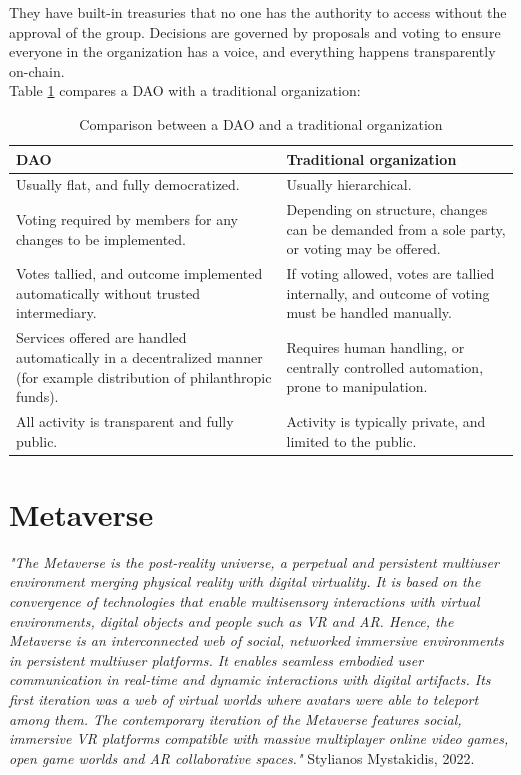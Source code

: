 \documentclass[MSE,Master,english]{twbook}%
\begin{document}
They have built-in treasuries that no one has the authority to access without the approval of the group. Decisions are governed by proposals and voting to ensure everyone in the organization has a voice, and everything happens transparently on-chain.\cite{DAO} \\

Table \ref{table:DAOComparison} compares a \gls{DAO} with a traditional organization:
\begin{center}
  \begin{table}[H]
    \begin{tabular}{ | m{20em} | m{20em} | }
      \hline
      \textbf{DAO} & \textbf{Traditional organization} \\ 
      \hline
      Usually flat, and fully democratized. & Usually hierarchical. \\
      \hline  
      Voting required by members for any changes to be implemented. & Depending on structure, changes can be demanded from a sole party, or voting may be offered. \\
      \hline
      Votes tallied, and outcome implemented automatically without trusted intermediary. & If voting allowed, votes are tallied internally, and outcome of voting must be handled manually. \\
      \hline
      Services offered are handled automatically in a decentralized manner (for example distribution of philanthropic funds). & Requires human handling, or centrally controlled automation, prone to manipulation. \\
      \hline
      All activity is transparent and fully public. & Activity is typically private, and limited to the public. \\
      \hline
    \end{tabular}
    \caption{Comparison between a \gls{DAO} and a traditional organization \cite{DAO}}
    \label{table:DAOComparison}
  \end{table}
\end{center}

\section{Metaverse}
\emph{"The Metaverse is the post-reality universe, a perpetual and persistent multiuser environment merging physical reality with digital virtuality. It is based on the convergence of technologies that enable multisensory interactions with virtual environments, digital objects and people such as \ac{VR} and \ac{AR}. Hence, the Metaverse is an interconnected web of social, networked immersive environments in persistent multiuser platforms. It enables seamless embodied user communication in real-time and dynamic interactions with digital artifacts. Its first iteration was a web of virtual worlds where avatars were able to teleport among them. The contemporary iteration of the Metaverse features social, immersive \gls{VR} platforms compatible with massive multiplayer online video games, open game worlds and \gls{AR} collaborative spaces."} Stylianos Mystakidis, 2022. \cite{metaverse} \\
\end{document}
